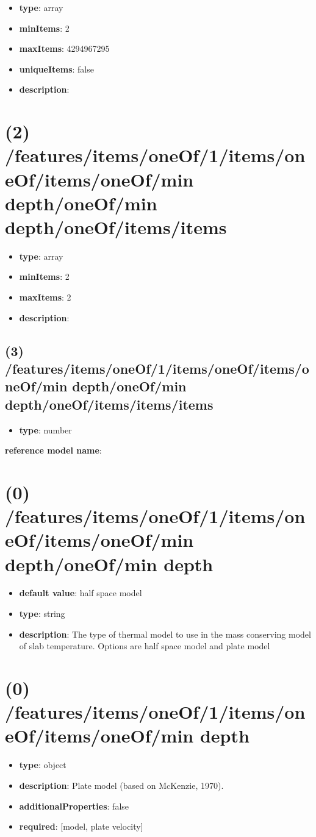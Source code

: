 \begin{itemize}[leftmargin=1em]\item {\bf type}: array
\item {\bf minItems}: 2
\item {\bf maxItems}: 4294967295
\item {\bf uniqueItems}: false
\item {\bf description}: 
\end{itemize}\section{(2) /features/items/oneOf/1/items/oneOf/items/oneOf/min depth/oneOf/min depth/oneOf/items/items}
\begin{itemize}[leftmargin=2em]\item {\bf type}: array
\item {\bf minItems}: 2
\item {\bf maxItems}: 2
\item {\bf description}: 
\end{itemize}\subsection{(3) /features/items/oneOf/1/items/oneOf/items/oneOf/min depth/oneOf/min depth/oneOf/items/items/items}
\begin{itemize}[leftmargin=3em]\item {\bf type}: number
\end{itemize}\item {\bf reference model name}: \section{(0) /features/items/oneOf/1/items/oneOf/items/oneOf/min depth/oneOf/min depth}
\begin{itemize}[leftmargin=0em]\item {\bf default value}: half space model
\item {\bf type}: string
\item {\bf description}: The type of thermal model to use in the mass conserving model of slab temperature. Options are half space model and plate model
\end{itemize}\section{(0) /features/items/oneOf/1/items/oneOf/items/oneOf/min depth}
\begin{itemize}[leftmargin=0em]\item {\bf type}: object
\item {\bf description}: Plate model (based on McKenzie, 1970).
\item {\bf additionalProperties}: false
\item {\bf required}: [model, plate velocity]\end{itemize}
